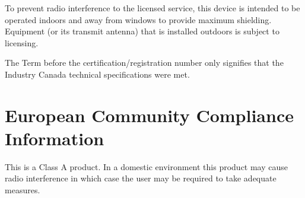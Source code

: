 To prevent radio interference to the licensed service, this device is intended to be operated indoors and away from windows to provide maximum shielding. Equipment (or its transmit antenna) that is installed outdoors is subject to licensing.

The Term  before the certification/registration number only signifies that the Industry Canada technical specifications were met.

\section[european-community-compliance-information]{European Community Compliance Information}

This is a Class A product. In a domestic environment this product may cause radio interference in which case the user may be required to take adequate measures.
\stopWARNING